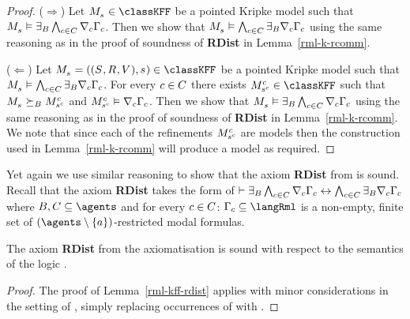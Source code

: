 \begin{proof}
($\Rightarrow$) Let $\kPModel{\kStateS} \in \classKFF$ be a pointed Kripke model such that $\kPModel{\kStateS} \entails \somerefsBs \bigwedge_{\agentC \in \agentsC} \coversC \Gamma_\agentC$.
Then we show that $\kPModel{\kStateS} \entails \bigwedge_{\agentC \in \agentsC} \somerefsBs \coversC \Gamma_\agentC$ using the same reasoning as in the proof of soundness of {\bf RDist} in Lemma~\ref{rml-k-rcomm}.

($\Leftarrow$) Let $\kPModelAndTuple{\kStateS} \in \classKFF$ be a pointed Kripke model such that $\kPModel{\kStateS} \entails \bigwedge_{\agentC \in \agentsC} \somerefsBs \coversC \Gamma_\agentC$.
For every $\agentC \in \agentsC$ there exists $\kPModel[\agentC]{\kStateS[\agentC]} \in \classKFF$ such that $\kPModel{\kStateS} \simulatesBs \kPModel[\agentC]{\kStateS[\agentC]}$ and $\kPModel[\agentC]{\kStateS[\agentC]} \entails \coversC \Gamma_\agentC$.
Then we show that $\kPModel{\kStateS} \entails \somerefsBs \bigwedge_{\agentC \in \agentsC} \coversC \Gamma_\agentC$ using the same reasoning as in the proof of soundness of {\bf RDist} in Lemma~\ref{rml-k-rcomm}.
We note that since each of the refinements $\kPModel[\agentC]{\kStateS[\agentC]}$ are \classKFF{} models then the construction used in Lemma~\ref{rml-k-rcomm} will produce a \classKFF{} model as required.
\end{proof}

Yet again we use similar reasoning to show that the axiom {\bf RDist} from \axiomRmlKD{} is sound.
Recall that the axiom {\bf RDist} takes the form of $\proves \somerefsBs \bigwedge_{\agentC \in \agentsC} \coversC \Gamma_\agentC \iff \bigwedge_{\agentC \in \agentsC} \somerefsBs \coversC \Gamma_\agentC$ where $\agentsB, \agentsC \subseteq \agents$ and for every $\agentC \in \agentsC$: $\Gamma_\agentC \subseteq \langRml$ is a non-empty, finite set of $(\agents \setminus \{\agentA\})$-restricted modal formulas.

\begin{lemma}\label{rml-kd45-rdist}
The axiom {\bf RDist} from the axiomatisation \axiomRmlKFF{} is sound with respect to the semantics of the logic \logicRmlKFF{}.
\end{lemma}

\begin{proof}
The proof of Lemma~\ref{rml-kff-rdist} applies with minor considerations in the setting of \logicRmlKD{}, simply replacing occurrences of \classKFF{} with \classKD{}.
\end{proof}

